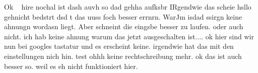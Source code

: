  
 
 Ok   hire nochal ist dash auvh so dad gehha aufksbr
 IRgendwie das scheie hsllo gehnicht bedstrt dsd t das uuss foch besser errnrn. WarJm isdad ssirgn keine ahnungn wordasn liegt.
 Aber schneint die eingsbe besser zu laufen. oder auch nicht. ich hab keine ahnung warum das jetzt ausgeschalten ist.... ok hier sind wir nun bei googles tastatur und es erscheint keine. irgendwie hat das mit den einstellungen nich hin.
 test ohhh keine rechtschreibung mehr. ok das ist auch besser so. weil es eh nicht funktioniert hier.
